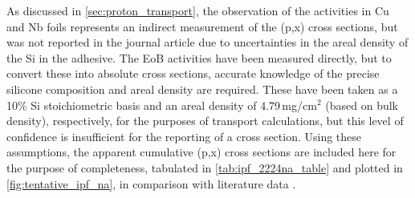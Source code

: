 As discussed in \autoref{sec:proton_transport}, the observation of the  activities in Cu and Nb foils  represents an indirect measurement of the (p,x) cross sections, but  was not  reported in the journal article due to 
uncertainties in the areal density of the Si in the adhesive.
The EoB  activities have been measured directly, but to convert these into absolute cross sections, accurate knowledge of the precise silicone composition and areal density are required.
These have been taken as  a 10\% Si stoichiometric basis and an areal density of 4.79\,mg/cm$^2$ (based on bulk density),
respectively, for the purposes of transport calculations, but this level of confidence is insufficient for the reporting of a cross section.
Using these assumptions, the apparent cumulative (p,x) cross sections are included here for the purpose of completeness, tabulated in  \autoref{tab:ipf_2224na_table} and plotted in  \autoref{fig:tentative_ipf_na}, in comparison with literature data  
\cite{Furukawa1971,R.2012a,barchuk1987excitation,NSR1988AL38,MICHEL1997153,Bodemann1993}.




